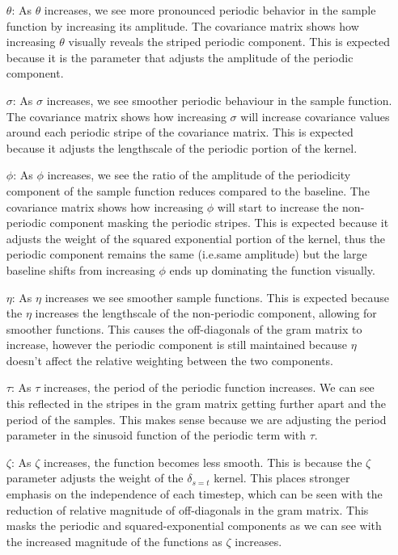 \documentclass[12pt]{article}
\begin{document}
\begin{itemize}
\item [$\theta$:] As $\theta$ increases, we see more pronounced periodic behavior in the sample function by increasing its amplitude.
    The covariance matrix shows how increasing $\theta$ visually reveals the striped periodic component.
        This is expected because it is the parameter that adjusts the amplitude of the periodic component.
\item [$\sigma$:] As $\sigma$ increases, we see smoother periodic behaviour in the sample function.
    The covariance matrix shows how increasing $\sigma$ will increase covariance values around each periodic stripe of the covariance matrix.
    This is expected because it adjusts the lengthscale of the periodic portion of the kernel.
\item [$\phi$:] As $\phi$ increases, we see the ratio of the amplitude of the periodicity component of the sample function reduces compared to the baseline.
    The covariance matrix shows how increasing $\phi$ will start to increase the non-periodic component masking the periodic stripes.
    This is expected because it adjusts the weight of the squared exponential portion of the kernel, thus the periodic component remains the same (i.e.same amplitude) but the large baseline shifts from increasing $\phi$ ends up dominating the function visually.
\item [$\eta$:] As $\eta$ increases we see smoother sample functions.
This is expected because the $\eta$ increases the lengthscale of the non-periodic component, allowing for smoother functions.
This causes the off-diagonals of the gram matrix to increase, however the periodic component is still maintained because $\eta$ doesn't affect the relative weighting between the two components.
\item [$\tau$:] As $\tau$ increases, the period of the periodic function increases.
We can see this reflected in the stripes in the gram matrix getting further apart and the period of the samples.
This makes sense because we are adjusting the period parameter in the sinusoid function of the periodic term with $\tau$.
\item [$\zeta$:] As $\zeta$ increases, the function becomes less smooth.
    This is because the $\zeta$ parameter adjusts the weight of the $\delta_{s=t}$ kernel.
    This places stronger emphasis on the independence of each timestep, which can be seen with the reduction of relative magnitude of off-diagonals in the gram matrix.
    This masks the periodic and squared-exponential components as we can see with the increased magnitude of the functions as $\zeta$ increases.
\end{itemize}
\end{document}
